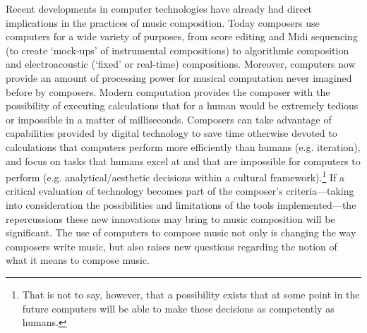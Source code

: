 Recent developments in computer technologies have already had direct implications in the practices of music composition. Today composers use computers for a wide variety of purposes, from score editing and Midi sequencing (to create `mock-ups' of instrumental compositions) to algorithmic composition and electroacoustic (`fixed' or real-time) compositions. Moreover, computers now provide an amount of processing power for musical computation never imagined before by composers. Modern computation provides the composer with the possibility of executing calculations that for a human would be extremely tedious or impossible in a matter of milliseconds. Composers can take advantage of capabilities provided by digital technology to save time otherwise devoted to calculations that computers perform more efficiently than humans (e.g. iteration), and focus on tasks that humans excel at and that are impossible for computers to perform (e.g. analytical/aesthetic decisions  within a cultural framework).\footnote{That is not to say, however, that a possibility exists that at some point in the future computers will be able to make these decisions as competently as humans.} If a critical evaluation of technology becomes part of the composer's criteria---taking into consideration the possibilities and limitations of the tools implemented---the repercussions these new innovations may bring to music composition will be significant. The use of computers to compose music not only is changing the way composers write music, but also raises new questions regarding the notion of what it means to compose music.
\hypertarget{realtimepos}{}

